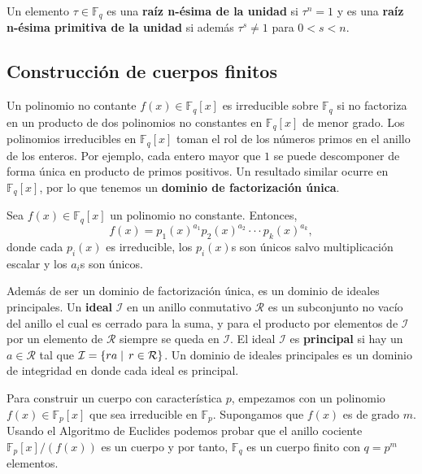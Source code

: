 \begin{definition}
Un elemento $\tau \in \mathbb{F}_q$ es una \textbf{raíz n-ésima de la unidad} si $\tau^n = 1$ y es una \textbf{raíz n-ésima primitiva de la unidad} si además $\tau^s \neq 1$ para $ 0 < s < n$.
\end{definition}

\subsection{Construcción de cuerpos finitos}

Un polinomio no contante $f(x) \in \mathbb{F}_q[x]$ es irreducible sobre $\mathbb{F}_q$ si no factoriza en un producto de dos polinomios no constantes en $\mathbb{F}_q[x]$ de menor grado. Los polinomios irreducibles en $\mathbb{F}_q[x]$ toman el rol de los números primos en el anillo de los enteros. Por ejemplo, cada entero mayor que $1$ se puede descomponer de forma única en producto de primos positivos. Un resultado similar ocurre en $\mathbb{F}_q[x]$, por lo que tenemos un \textbf{dominio de factorización única}.


\begin{theorem}
\label{th:factorizar_f}
Sea $f(x) \in \mathbb{F}_q[x] $ un polinomio no constante. Entonces, 
\[
f(x) = p_1(x)^{a_1}p_2(x)^{a_2}\cdot \cdot \cdot p_k(x)^{a_k} ,
\]
donde cada $p_i(x)$ es irreducible, los $p_i(x)$s son únicos salvo multiplicación escalar y los $a_i$s son únicos.
\end{theorem}

Además de ser un dominio de factorización única, es un dominio de ideales principales. Un \textbf{ideal} $\mathcal{I}$ en un anillo conmutativo $\mathcal{R}$ es un subconjunto no vacío del anillo el cual es cerrado para la suma, y para el producto por elementos de $\mathcal{I}$ por un elemento de $\mathcal{R}$ siempre se queda en $\mathcal{I}$. El ideal $\mathcal{I}$ es \textbf{principal} si hay un $ a \in \mathcal{R}$ tal que $\mathcal{I} = \{ ra \mid \thinspace r \in \mathcal{R} \}$. Un dominio de ideales principales es un dominio de integridad en donde cada ideal es principal.

 Para construir un cuerpo con característica $p$, empezamos con un polinomio $f(x) \in \mathbb{F}_p[x]$ que sea irreducible en $\mathbb{F}_p$. Supongamos que $f(x)$ es de grado $m$. Usando el Algoritmo de Euclides podemos probar que el anillo cociente $ \mathbb{F}_p[x]/(f(x))$ es un cuerpo y por tanto, $\mathbb{F}_q$ es un cuerpo finito con $q = p^m$ elementos. 
 
